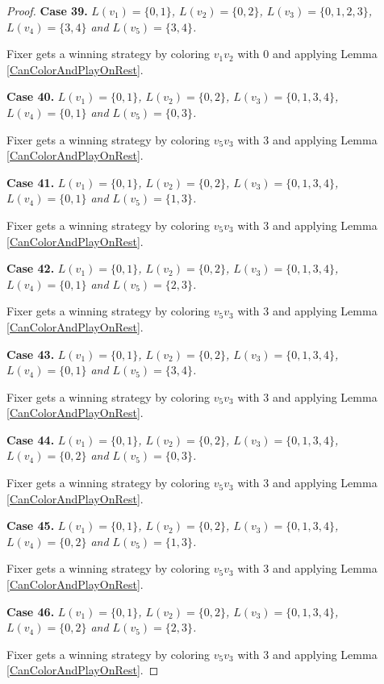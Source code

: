 \documentclass[12pt]{amsart}
\theoremstyle{plain}
\theoremstyle{definition}
\theoremstyle{remark}
\begin{document}
\begin{proof}
\noindent\textbf{Case 39.  }\textit{$L(v_1) = \{0, 1\}$, $L(v_2) = \{0, 2\}$, $L(v_3) = \{0, 1, 2, 3\}$, $L(v_4) = \{3, 4\}$ and $L(v_5) = \{3, 4\}$.}

Fixer gets a winning strategy by coloring $v_1v_2$ with $0$ and applying Lemma \ref{CanColorAndPlayOnRest}.

\noindent\textbf{Case 40.  }\textit{$L(v_1) = \{0, 1\}$, $L(v_2) = \{0, 2\}$, $L(v_3) = \{0, 1, 3, 4\}$, $L(v_4) = \{0, 1\}$ and $L(v_5) = \{0, 3\}$.}

Fixer gets a winning strategy by coloring $v_5v_3$ with $3$ and applying Lemma \ref{CanColorAndPlayOnRest}.

\noindent\textbf{Case 41.  }\textit{$L(v_1) = \{0, 1\}$, $L(v_2) = \{0, 2\}$, $L(v_3) = \{0, 1, 3, 4\}$, $L(v_4) = \{0, 1\}$ and $L(v_5) = \{1, 3\}$.}

Fixer gets a winning strategy by coloring $v_5v_3$ with $3$ and applying Lemma \ref{CanColorAndPlayOnRest}.

\noindent\textbf{Case 42.  }\textit{$L(v_1) = \{0, 1\}$, $L(v_2) = \{0, 2\}$, $L(v_3) = \{0, 1, 3, 4\}$, $L(v_4) = \{0, 1\}$ and $L(v_5) = \{2, 3\}$.}

Fixer gets a winning strategy by coloring $v_5v_3$ with $3$ and applying Lemma \ref{CanColorAndPlayOnRest}.

\noindent\textbf{Case 43.  }\textit{$L(v_1) = \{0, 1\}$, $L(v_2) = \{0, 2\}$, $L(v_3) = \{0, 1, 3, 4\}$, $L(v_4) = \{0, 1\}$ and $L(v_5) = \{3, 4\}$.}

Fixer gets a winning strategy by coloring $v_5v_3$ with $3$ and applying Lemma \ref{CanColorAndPlayOnRest}.

\noindent\textbf{Case 44.  }\textit{$L(v_1) = \{0, 1\}$, $L(v_2) = \{0, 2\}$, $L(v_3) = \{0, 1, 3, 4\}$, $L(v_4) = \{0, 2\}$ and $L(v_5) = \{0, 3\}$.}

Fixer gets a winning strategy by coloring $v_5v_3$ with $3$ and applying Lemma \ref{CanColorAndPlayOnRest}.

\noindent\textbf{Case 45.  }\textit{$L(v_1) = \{0, 1\}$, $L(v_2) = \{0, 2\}$, $L(v_3) = \{0, 1, 3, 4\}$, $L(v_4) = \{0, 2\}$ and $L(v_5) = \{1, 3\}$.}

Fixer gets a winning strategy by coloring $v_5v_3$ with $3$ and applying Lemma \ref{CanColorAndPlayOnRest}.

\noindent\textbf{Case 46.  }\textit{$L(v_1) = \{0, 1\}$, $L(v_2) = \{0, 2\}$, $L(v_3) = \{0, 1, 3, 4\}$, $L(v_4) = \{0, 2\}$ and $L(v_5) = \{2, 3\}$.}

Fixer gets a winning strategy by coloring $v_5v_3$ with $3$ and applying Lemma \ref{CanColorAndPlayOnRest}.


\end{proof}
\end{document}
